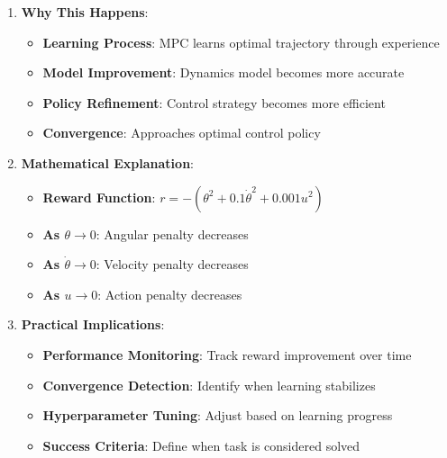 \begin{itemize}
\begin{enumerate}
        \item \textbf{Why This Happens}:
        \begin{itemize}
            \item \textbf{Learning Process}: MPC learns optimal trajectory through experience
            \item \textbf{Model Improvement}: Dynamics model becomes more accurate
            \item \textbf{Policy Refinement}: Control strategy becomes more efficient
            \item \textbf{Convergence}: Approaches optimal control policy
        \end{itemize}
        
        \item \textbf{Mathematical Explanation}:
        \begin{itemize}
            \item \textbf{Reward Function}: $r = -(\theta^2 + 0.1\dot{\theta}^2 + 0.001u^2)$
            \item \textbf{As $\theta \to 0$}: Angular penalty decreases
            \item \textbf{As $\dot{\theta} \to 0$}: Velocity penalty decreases
            \item \textbf{As $u \to 0$}: Action penalty decreases
        \end{itemize}
        
        \item \textbf{Practical Implications}:
        \begin{itemize}
            \item \textbf{Performance Monitoring}: Track reward improvement over time
            \item \textbf{Convergence Detection}: Identify when learning stabilizes
            \item \textbf{Hyperparameter Tuning}: Adjust based on learning progress
            \item \textbf{Success Criteria}: Define when task is considered solved
        \end{itemize}
    \end{enumerate}
\end{itemize}
